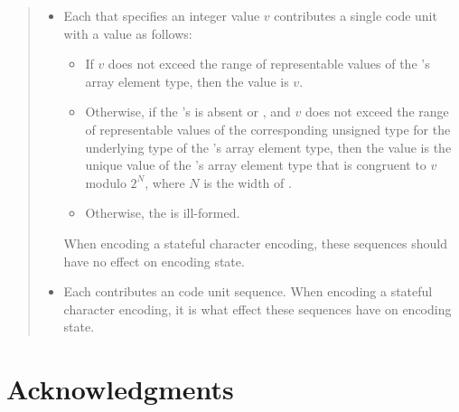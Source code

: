 \documentclass{wg21}
\begin{document}
\begin{quote}
\begin{itemize}
            \item
            Each 
            that specifies an integer value $v$
            contributes a single code unit with a value as follows:
            \begin{itemize}
                \item
                If $v$ does not exceed the range of representable values of
                the 's array element type,
                then the value is $v$.
                \item
                Otherwise,
                if the 's 
                is absent or , and
                $v$ does not exceed the range of representable values of
                the corresponding unsigned type for the underlying type of
                the 's array element type,
                then the value is the unique value of
                the 's array element type 
                that is congruent to $v$ modulo $2^N$, where $N$ is the width of .
                \item
                Otherwise, the  is ill-formed.
            \end{itemize}
            When encoding a stateful character encoding,
            these sequences should have no effect on encoding state.
            \item
            Each 
            contributes an
            code unit sequence.
            When encoding a stateful character encoding,
            it is
            what effect these sequences have on encoding state.
        \end{itemize}
        
        
        
        
    \end{quote}
    
    \section{Acknowledgments}
    
\end{document}
